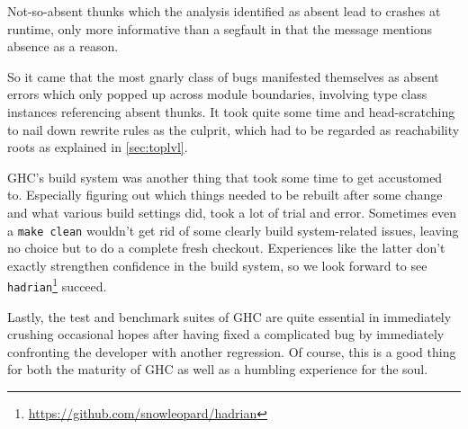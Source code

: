 Not-so-absent thunks which the analysis identified as absent lead to crashes at runtime, only more informative than a segfault in that the message mentions absence as a reason.

So it came that the most gnarly class of bugs manifested themselves as absent errors which only popped up across module boundaries, involving type class instances referencing absent thunks.
It took quite some time and head-scratching to nail down rewrite rules as the culprit, which had to be regarded as reachability roots as explained in \cref{sec:toplvl}.

GHC's build system was another thing that took some time to get accustomed to.
Especially figuring out which things needed to be rebuilt after some change and what various build settings did, took a lot of trial and error.
Sometimes even a \texttt{make clean} wouldn't get rid of some clearly build system-related issues, leaving no choice but to do a complete fresh checkout.
Experiences like the latter don't exactly strengthen confidence in the build system, so we look forward to see \texttt{hadrian}\footnote{\url{https://github.com/snowleopard/hadrian}} succeed.

Lastly, the test and benchmark suites of GHC are quite essential in immediately crushing occasional hopes after having fixed a complicated bug by immediately confronting the developer with another regression.
Of course, this is a good thing for both the maturity of GHC as well as a humbling experience for the soul.
